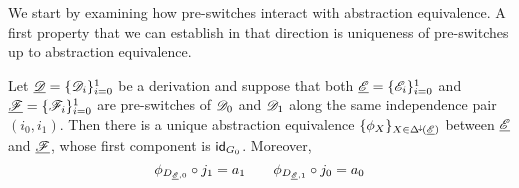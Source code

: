 We start by examining how pre-switches interact with abstraction equivalence. A first property that we can establish in that direction is uniqueness of pre-switches up to abstraction equivalence.

\begin{lemma}
	\label{thm:switch_uni}
	Let $\underline{\mathscr{D}}=\{\mathscr{D}_{i}\}_{i=0}^1$ be a derivation and suppose
	that both $\underline{\mathscr{E}}=\{\mathscr{E}_i\}_{i=0}^1$ and
	$\underline{\mathscr{F}}=\{\mathscr{F}_i\}_{i=0}^1$ are pre-switches of $\mathscr{D}_0$ and
	$\mathscr{D}_1$ along the same independence pair $(i_0, i_1)$. Then there is a unique abstraction equivalence $\{\phi_X\}_{X\in \Delta^{\hspace{-1pt}\downarrow\hspace{-1pt}}(\underline{\mathscr{E}})}$ between $\underline{\mathscr{E}}$ and $\underline{\mathscr{F}}$, whose first component is $\mathsf{id}_{G_0}$. Moreover, 
	\[\phi_{D_{\underline{\mathscr{E}}, 0}}\circ j_1=a_1 \qquad \phi_{D_{\underline{\mathscr{E}}, 1}}\circ j_0=a_0\]
\end{lemma}

